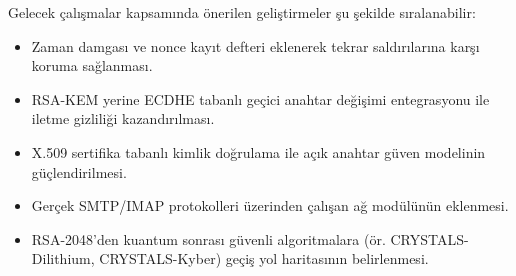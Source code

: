 Gelecek çalışmalar kapsamında önerilen geliştirmeler şu şekilde sıralanabilir:

\begin{itemize}
    \item Zaman damgası ve nonce kayıt defteri eklenerek tekrar saldırılarına karşı koruma sağlanması.
    \item RSA-KEM yerine ECDHE tabanlı geçici anahtar değişimi entegrasyonu ile iletme gizliliği kazandırılması.
    \item X.509 sertifika tabanlı kimlik doğrulama ile açık anahtar güven modelinin güçlendirilmesi.
    \item Gerçek SMTP/IMAP protokolleri üzerinden çalışan ağ modülünün eklenmesi.
    \item RSA-2048'den kuantum sonrası güvenli algoritmalara (ör. CRYSTALS-Dilithium, CRYSTALS-Kyber) geçiş yol haritasının belirlenmesi.
\end{itemize}

\clearpage